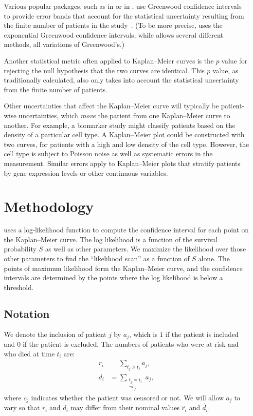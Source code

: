 \documentclass[article]{jss}
\newcommand{\KM}{Kaplan--Meier} %
\begin{document}
Various popular packages, such as  \citep{survival-package} in  \citep{R} or  \citep{lifelines} in , use Greenwood confidence intervals to provide error bands that account for the statistical uncertainty resulting from the finite number of patients in the study~\citep{GreenwoodNotes,Greenwood}. (To be more precise,  uses the exponential Greenwood confidence intervals, while  allows several different methods, all variations of Greenwood's.)

Another statistical metric often applied to \KM{} curves is the \(p\) value for rejecting the null hypothesis that the two curves are identical.  This \(p\) value, as traditionally calculated, also only takes into account the statistical uncertainty from the finite number of patients.

Other uncertainties that affect the \KM{} curve will typically be patient-wise uncertainties, which \emph{move} the patient from one \KM{} curve to another. For example, a biomarker study might classify patients based on the density of a particular cell type. A \KM{} plot could be constructed with two curves, for patients with a high and low density of the cell type. However, the cell type is subject to Poisson noise as well as systematic errors in the measurement. Similar errors apply to \KM{} plots that stratify patients by gene expression levels or other continuous variables.

\section{Methodology}\label{sec:methodology}

 uses a log-likelihood function to compute the confidence interval for each point on the \KM{} curve. The log likelihood is a function of the survival probability \(S\) as well as other parameters. We maximize the likelihood over those other parameters to find the ``likelihood scan'' as a function of \(S\) alone. The points of maximum likelihood form the \KM{} curve, and the confidence intervals are determined by the points where the log likelihood is below a threshold.

\subsection{Notation}\label{sec:notation}

We denote the inclusion of patient \(j\) by \(a_j\), which is \(1\) if the patient is included and \(0\) if the patient is excluded. The numbers of patients who were at risk and who died at time \(t_i\) are:
\begin{align}
r_i &= \sum_{t_j \geq t_i} a_j, \\
d_i &= \sum_{\substack{t_j = t_i \\ \neg c_j}} a_j,
\end{align}
where \(c_j\) indicates whether the patient was censored or not. We will allow \(a_j\) to vary so that \(r_i\) and \(d_i\) may differ from their nominal values \(\hat{r}_i\) and \(\hat{d}_i\).
\end{document}
